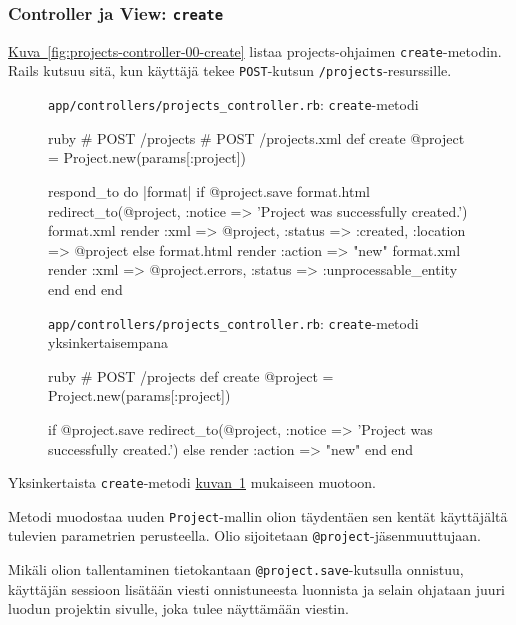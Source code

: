 \documentclass{article}
\newenvironment{myfigure}[1][tbp]{
  \begin{figure}[#1]
    \centering
    \begin{lrbox}{\myfigurebox}
      \begin{minipage}{\textwidth}
}{
      \end{minipage}
    \end{lrbox}
    \colorbox{blue!4}{\usebox{\myfigurebox}}
  \end{figure}
}
\newcommand{\myref}[2]{\hyperref[#2]{#1~\ref*{#2}}}
\newcommand{\pdfforeignlanguage}[2]{\texorpdfstring{\foreignlanguage{#1}{#2}}{#2}}
\newcommand{\eng}[1]{\pdfforeignlanguage{english}{#1}}
\begin{document}
\subsubsection{\eng{Controller} ja \eng{View}: \texttt{create}}

\begin{samepage}
\myref{Kuva}{fig:projects-controller-00-create} listaa projects-ohjaimen
\texttt{create}-metodin. Rails kutsuu sitä, kun käyttäjä tekee
\texttt{POST}-kutsun \texttt{/projects}-resurssille.

\begin{myfigure}[H]
\caption{\texttt{app/controllers/projects\_controller.rb}:
\texttt{create}-metodi}
\label{fig:projects-controller-00-create}

\begin{pygmented}{ruby}
  # POST /projects
  # POST /projects.xml
  def create
    @project = Project.new(params[:project])

    respond_to do |format|
      if @project.save
        format.html { redirect_to(@project, :notice => 'Project was successfully created.') }
        format.xml  { render :xml => @project, :status => :created, :location => @project }
      else
        format.html { render :action => "new" }
        format.xml  { render :xml => @project.errors, :status => :unprocessable_entity }
      end
    end
  end
\end{pygmented}

\caption{\texttt{app/controllers/projects\_controller.rb}:
\texttt{create}-metodi yksinkertaisempana}
\label{fig:projects-controller-01-create}

\begin{pygmented}{ruby}
  # POST /projects
  def create
    @project = Project.new(params[:project])

    if @project.save
      redirect_to(@project, :notice => 'Project was successfully created.')
    else
      render :action => "new"
    end
  end
\end{pygmented}
\end{myfigure}
\end{samepage}

Yksinkertaista \texttt{create}-metodi
\myref{kuvan}{fig:projects-controller-01-create} mukaiseen muotoon.

Metodi muodostaa uuden \texttt{Project}-mallin olion täydentäen sen kentät
käyttäjältä tulevien parametrien perusteella. Olio sijoitetaan
\texttt{@project}-jäsenmuuttujaan.

Mikäli olion tallentaminen tietokantaan \texttt{@project.save}-kutsulla
onnistuu, käyttäjän sessioon lisätään viesti onnistuneesta luonnista ja selain
ohjataan juuri luodun projektin sivulle, joka tulee näyttämään viestin.
\end{document}
